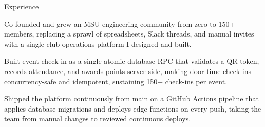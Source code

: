 \documentclass[
	11pt
]{../../../template}
\begin{document}
\begin{rSection}{E}{xperience}
\begin{rSectionEntry}
			\item Co-founded and grew an MSU engineering community from zero to 150+ members, replacing a sprawl of spreadsheets, Slack threads, and manual invites with a single club-operations platform I designed and built.
			\item Built event check-in as a single atomic database RPC that validates a QR token, records attendance, and awards points server-side, making door-time check-ins concurrency-safe and idempotent, sustaining 150+ check-ins per event.
			\item Shipped the platform continuously from main on a GitHub Actions pipeline that applies database migrations and deploys edge functions on every push, taking the team from manual changes to reviewed continuous deploys.
		\end{rSectionEntry}
	\end{rSection}
\end{document}
